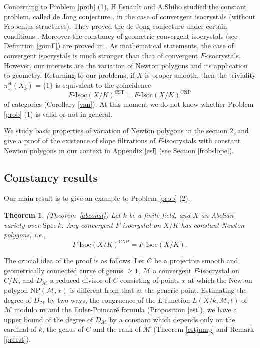 \documentclass[11pt]{amsart}
\newtheorem{theorem}[Lemma]{Theorem}
\begin{document}
Concerning to Problem \ref{prob} (1), H.Esnault and A.Shiho studied the constant problem, 
called de Jong conjecture \cite[Conjecture 2.1]{ES}, in the case 
of convergent isocrystals (without Frobenius structures). 
They proved the de Jong conjecture under certain conditions \cite{Shi} \cite{ES} \cite{ES2}. 
Moreover the constancy of geometric convergent isocrystals (see Definition \ref{gomF}) 
are proved in \cite[Theorem 1.3]{ES2}. 
As mathematical statements, the case of convergent isocrystals 
is much stronger than that of convergent $F$-isocrystals. However, our interests are the variation of Newton polygons 
and its application to geometry. 
Returning to our problems, if $X$ is proper smooth, 
then the triviality $\pi_1^{\mathrm{et}}(X_{\overline{k}}) = \{ 1\}$ is equivalent to the coincidence 
$$
     F\mbox{-}\mathrm{Isoc}(X/K)^{\mathrm{CST}} = F\mbox{-}\mathrm{Isoc}(X/K)^{\mathrm{CNP}} 
$$
of categories (Corollary \ref{van}). 
At this moment we do not know whether Problem \ref{prob} (1) is valid or not in general. 

We study basic properties of variation of Newton polygons in the section $2$, 
and give a proof of the existence of slope filtrations of 
$F$-isocrystals with constant Newton polygons in our context in Appendix \ref{esf} (see Section \ref{frobslope}). 

\subsection{Constancy results}\label{conres}

Our main result is to give an example to Problem \ref{prob} (2). 

\begin{theorem}\label{abconst0} \mbox{\rm (Theorem \ref{abconst})} 
Let $k$ be a finite field, and $X$ an Abelian variety over $\mathrm{Spec}\, k$. 
Any convergent $F$-isocrystal on $X/K$ has constant Newton polygons, i.e., 
$$
   F\mbox{-}\mathrm{Isoc}(X/K)^{\mathrm{CNP}} = F\mbox{-}\mathrm{Isoc}(X/K). 
$$
\end{theorem}

The crucial idea of the proof is as follows. Let $C$ be a projective smooth and 
geometrically connected curve of genus $\geq 1$, 
$\mathcal M$ a convergent $F$-isocrystal on $C/K$, and $D_{\mathcal M}$ 
a reduced divisor of $C$ consisting of points $x$ at which the Newton polygon $\mathrm{NP}(\mathcal M, x)$ 
is different from that at the generic point. 
Estimating the degree of $D_{\mathcal M}$ by two ways, the congruence of the $L$-function 
$L(X/k, \mathcal M; t)$ of $\mathcal M$ modulo $\mathbf m$ and the Euler-Poincar\'e formula (Proposition \ref{est}), 
we have a upper bound of the degree of $D_{\mathcal M}$ by a constant 
which depends only on the cardinal of $k$, the genus of $C$ and the 
rank of $\mathcal M$ (Theorem \ref{estjump} and Remark \ref{preest}). 
\end{document}
